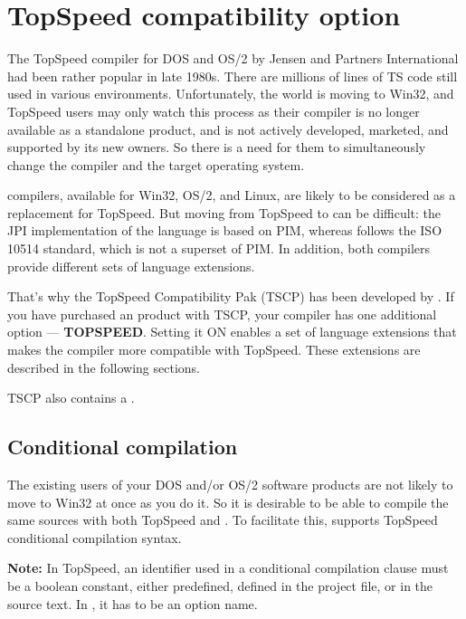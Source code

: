 \appendix


\chapter{TopSpeed compatibility option}

The TopSpeed \mt{} compiler for DOS and OS/2 by Jensen and Partners
International had been rather popular in late 1980s. There are millions of 
lines of TS \mt{} code still used in various environments. Unfortunately, 
the world is moving to Win32, and TopSpeed users may only watch this process
as their compiler is no longer available as a standalone product, and is not 
actively developed, marketed, and supported by its new owners. 
So there is a need for them to simultaneously change the compiler and the
target operating system.

\xds{} \mt{} compilers, available for Win32, OS/2, and Linux, are likely
to be considered as a replacement for TopSpeed. But moving from TopSpeed
to \xds{} can be difficult: the JPI implementation of the language is
based on PIM, whereas \xds{} follows the ISO 10514 standard, which is not
a superset of PIM. In addition, both compilers provide different sets of
language extensions.

That's why the TopSpeed Compatibility Pak (TSCP) has been developed by 
\XDS{}. If you have purchased an \xds{} product with TSCP, your compiler 
has one additional option --- {\bf TOPSPEED}. Setting it ON enables a set of 
language extensions that makes the compiler more compatible with TopSpeed.
These extensions are described in the following sections.

TSCP also contains a .

\section{Conditional compilation}
\label{tsco:cc}

The existing users of your DOS and/or OS/2 software products are not likely
to move to Win32 at once as you do it. So it is desirable to be able to 
compile the same sources with both TopSpeed and \xds{}. To facilitate this,
\xds{} supports TopSpeed conditional compilation syntax.

{\bf Note:} In TopSpeed, an identifier used in a conditional compilation 
clause must be a boolean constant, either predefined, defined in the project 
file, or in the source text. In \XDS{}, it has to be an option name.


